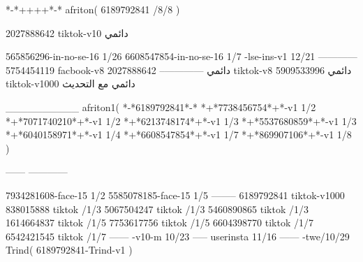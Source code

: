 *-*++++*-*
afriton(
6189792841 /8/8
)

2027888642 tiktok-v10
دائمي

565856296-in-no-se-16 1/26
6608547854-in-no-se-16 1/7
-lse-ins-v1 12/21
------------
5754454119 facbook-v8
دائمي
--------------
2027888642 tiktok-v8
دائمي
5909533996 tiktok-v1000
دائمي مع التحديث

__________
afriton1(
*-*6189792841*-*
*+*7738456754*+*-v1 1/2
*+*7071740210*+*-v1 1/2
*+*6213748174*+*-v1 1/3
*+*5537680859*+*-v1 1/3
*+*6040158971*+*-v1 1/4
*+*6608547854*+*-v1 1/7
*+*869907106*+*-v1 1/8
)

------
------------

7934281608-face-15 1/2
5585078185-face-15 1/5
--------
6189792841 tiktok-v1000
838015888 tiktok /1/3
5067504247 tiktok /1/3
5460890865 tiktok /1/3
1614664837 tiktok /1/5
7753617756 tiktok /1/5
6604398770 tiktok /1/7
6542421545 tiktok /1/7
------
-v10-m 10/23
-----
userinsta 11/16
------
-twe/10/29
Trind(
6189792841-Trind-v1 
)
